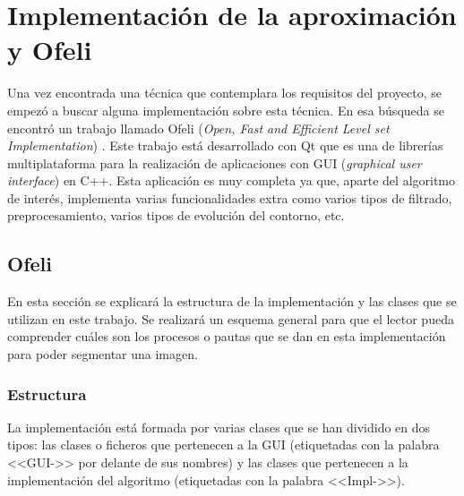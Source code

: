\chapter{Implementaci\'{o}n de la aproximaci\'{o}n y Ofeli}

Una vez encontrada una t\'{e}cnica que contemplara los requisitos del proyecto, se empez\'{o} a buscar alguna implementaci\'{o}n sobre esta t\'{e}cnica. En esa b\'{u}squeda se encontr\'{o} un trabajo llamado Ofeli (\textit{Open, Fast and Efficient Level set Implementation}) \cite{ofeli}. Este trabajo est\'{a} desarrollado con Qt que es una de librer\'{i}as multiplataforma para la realizaci\'{o}n de aplicaciones con GUI (\textit{graphical user interface}) en C++. Esta aplicaci\'{o}n es muy completa ya que, aparte del algoritmo de inter\'{e}s, implementa varias funcionalidades extra como varios tipos de filtrado, preprocesamiento, varios tipos de evoluci\'{o}n del contorno, etc.

\section{Ofeli}

En esta secci\'{o}n se explicar\'{a} la estructura de la implementaci\'{o}n y las clases que se utilizan en este trabajo. Se realizar\'{a} un esquema general para que el lector pueda comprender cu\'{a}les son los procesos o pautas que se dan en esta implementaci\'{o}n para poder segmentar una imagen.


\subsection{Estructura}

La implementaci\'{o}n est\'{a} formada por varias clases que se han dividido en dos tipos: las clases o ficheros que pertenecen a la GUI (etiquetadas con la palabra <<GUI->> por delante de sus nombres) y las clases que pertenecen a la implementaci\'{o}n del algoritmo (etiquetadas con la palabra <<Impl->>).

